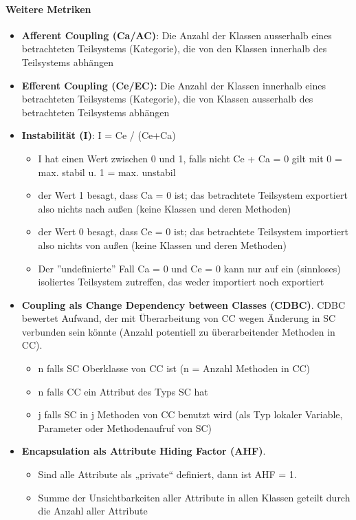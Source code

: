 \paragraph{Weitere Metriken}
\begin{itemize}
	\item \textbf{Afferent Coupling (Ca/AC)}: Die Anzahl der Klassen ausserhalb eines betrachteten Teilsystems (Kategorie), die von den Klassen innerhalb des Teilsystems abhängen
	\item \textbf{Efferent Coupling (Ce/EC):} Die Anzahl der Klassen innerhalb eines betrachteten Teilsystems (Kategorie), die von Klassen ausserhalb des betrachteten Teilsystems abhängen
	\item \textbf{Instabilität (I)}:   I = Ce / (Ce+Ca)
	\begin{itemize}
		\item I hat einen Wert zwischen 0 und 1, falls nicht Ce + Ca = 0 gilt mit 0 = max. stabil u. 1 = max. unstabil
		\item der Wert 1 besagt, dass Ca = 0 ist; das betrachtete Teilsystem exportiert also nichts nach außen (keine Klassen und deren Methoden) 
		\item der Wert 0 besagt, dass Ce = 0 ist; das betrachtete Teilsystem importiert also nichts von außen (keine Klassen und deren Methoden)
		\item Der ''undefinierte'' Fall Ca = 0 und Ce = 0 kann nur auf ein (sinnloses) isoliertes Teilsystem zutreffen, das weder importiert noch exportiert 
	\end{itemize}
	\item \textbf{Coupling als Change Dependency between Classes (CDBC)}. CDBC bewertet Aufwand, der mit Überarbeitung von CC wegen Änderung in SC verbunden sein könnte (Anzahl potentiell zu überarbeitender Methoden in CC).
	\begin{itemize}
		\item  n falls SC Oberklasse von CC ist (n = Anzahl Methoden in CC)
		\item n falls CC ein Attribut des Typs SC hat
		\item j falls SC in j Methoden von CC benutzt wird (als Typ lokaler Variable, Parameter oder Methodenaufruf von SC)
	\end{itemize}
	\item \textbf{Encapsulation als Attribute Hiding Factor (AHF)}.
	\begin{itemize}
		\item Sind alle Attribute als „private“ definiert, dann ist AHF = 1.
		\item Summe der Unsichtbarkeiten aller Attribute in allen Klassen geteilt durch die Anzahl aller Attribute

\end{itemize}
\end{itemize}
